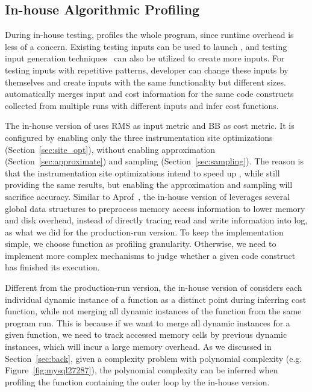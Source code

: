 \subsection{In-house Algorithmic Profiling}
\label{sec:in-house}

During in-house testing, \Tool profiles the whole program, 
since runtime overhead is less of a concern. 
Existing testing inputs can be used to launch \Tool, 
and testing input generation techniques~\cite{KLEE,dart,s2e} 
can also be utilized to create more inputs.
For testing inputs with repetitive patterns, 
developer can change these inputs by themselves 
and create inputs with the same functionality but different sizes. 
\Tool automatically merges input and cost information 
for the same code constructs
collected from multiple runs with different inputs and infer cost functions. 


The in-house version of \Tool uses RMS as input metric and BB
as cost metric.
It is configured by enabling only the three instrumentation site optimizations 
(Section~\ref{sec:site_opt}), without enabling approximation (Section~\ref{sec:approximate})
and sampling (Section~\ref{sec:sampling}). 
The reason is that the instrumentation site optimizations intend to speed up \Tool, 
while still providing the same results, 
but enabling the approximation and sampling will sacrifice accuracy. 
Similar to Aprof~\cite{Aprof1,Aprof2}, 
the in-house version of \Tool leverages several global data structures
to preprocess memory access information to lower memory and disk overhead,
instead of directly tracing read and write information into log, 
as what we did for the production-run version. 
To keep the implementation simple, 
we choose function as profiling granularity.
Otherwise, we need to implement more complex 
mechanisms to judge whether a given code construct 
has finished its execution.  

Different from the production-run version, the in-house version of \Tool 
considers each individual dynamic instance of a function 
as a distinct point during inferring cost function, 
while not merging all dynamic instances of the function 
from the same program run.
This is because if we want to merge all dynamic instances for a given function, 
we need to track accessed memory cells by previous dynamic instances, 
which will incur a large memory overhead. 
As we discussed in Section~\ref{sec:back}, 
given a complexity problem with polynomial complexity 
(e.g. Figure~\ref{fig:mysql27287}),  
the polynomial complexity can be inferred when profiling 
the function containing the outer loop by the in-house version.

